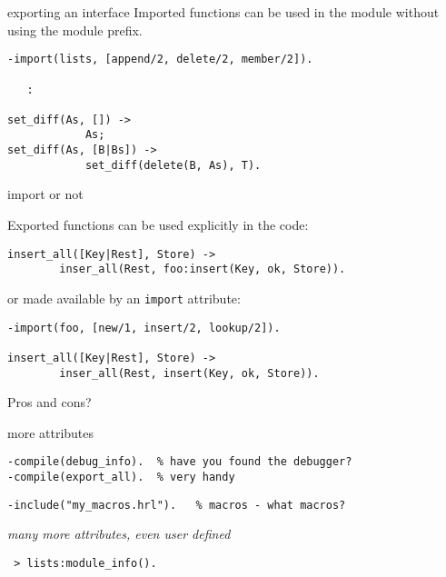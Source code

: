 \begin{frame}[fragile]{exporting an interface}
Imported functions can be used in the module without using the module prefix.

\begin{verbatim}
-import(lists, [append/2, delete/2, member/2]).

   :

set_diff(As, []) ->
            As;
set_diff(As, [B|Bs]) ->
            set_diff(delete(B, As), T).
\end{verbatim}
\pause \vspace{20pt}


\end{frame}

\begin{frame}[fragile]{import or not}

\pause \vspace{20pt}
Exported functions can be used explicitly in the code:

\begin{verbatim}
insert_all([Key|Rest], Store) ->
        inser_all(Rest, foo:insert(Key, ok, Store)).
\end{verbatim}

\pause \vspace{20pt}
or made available by an {\tt import} attribute:

\begin{verbatim}
-import(foo, [new/1, insert/2, lookup/2]).

insert_all([Key|Rest], Store) ->
        inser_all(Rest, insert(Key, ok, Store)).
\end{verbatim}
\pause \vspace{20pt}
Pros and cons?

\end{frame}

\begin{frame}[fragile]{more attributes}

\begin{verbatim}
-compile(debug_info).  % have you found the debugger?
-compile(export_all).  % very handy 
\end{verbatim}
\pause \vspace{20pt}

\begin{verbatim}
-include("my_macros.hrl").   % macros - what macros?
\end{verbatim}
\pause \vspace{20pt}

{\em many more attributes, even user defined}

\pause \vspace{20pt}

\begin{verbatim}
 > lists:module_info().
\end{verbatim}

\end{frame}

